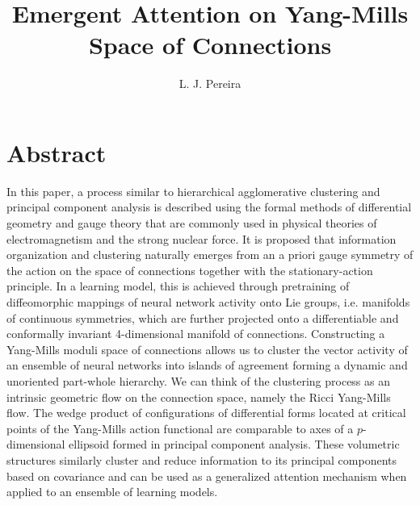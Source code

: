 \documentclass{article}
\title{ Emergent Attention on 
Yang-Mills \\Space of Connections}
\author{%
  L. J. Pereira \\
}
\newcommand{\stoptocwriting}{%
  \addtocontents{toc}{\protect\setcounter{tocdepth}{-5}}}
\begin{document}
\setlength{\abovedisplayskip}{4pt}
\setlength{\belowdisplayskip}{4pt}

\vspace{-2cm}
\maketitle


\renewcommand{\baselinestretch}{1.0}\normalsize
\section*{Abstract}
In this paper, a process similar to hierarchical agglomerative clustering and principal component analysis is described using the formal methods of differential geometry and gauge theory that are commonly used in physical theories of electromagnetism and the strong nuclear force.
It is proposed that information organization and clustering naturally emerges from an a priori gauge symmetry of the action on the space of connections together with the stationary-action principle. In a learning model, this is achieved through pretraining of diffeomorphic mappings of neural network activity onto Lie groups, i.e. manifolds of continuous symmetries, which are further projected onto a differentiable and conformally invariant 4-dimensional manifold of connections. 
Constructing a Yang-Mills moduli space of connections allows us to cluster the vector activity of an ensemble of neural networks into islands of agreement forming a dynamic and unoriented part-whole hierarchy.
We can think of the clustering process as an intrinsic geometric flow on the connection space, namely the Ricci Yang-Mills flow.
The wedge product of configurations of differential forms located at critical points of the Yang-Mills action functional are comparable to axes of a $p$-dimensional ellipsoid formed in principal component analysis. These volumetric structures similarly cluster and reduce information to its principal components based on covariance and can be used as a generalized attention mechanism when applied to an ensemble of learning models. 
\end{document}
